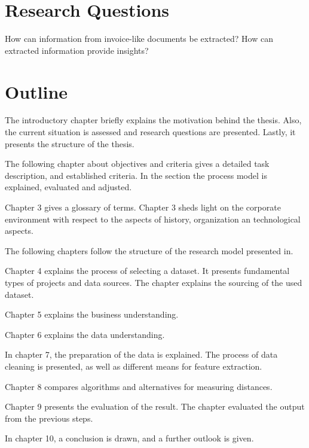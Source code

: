 \section{Research Questions}
\label{research-q}
How can information from invoice-like documents be extracted?
How can extracted information provide insights?

\section{Outline}
The introductory chapter briefly explains the motivation behind the thesis. Also, the current situation is assessed and research questions are presented. Lastly, it presents the structure of the thesis.

The following chapter about objectives and criteria gives a detailed task description, and established criteria. In the section the process model is explained, evaluated and adjusted.

Chapter 3 gives a glossary of terms. Chapter 3 sheds light on the corporate environment with respect to the aspects of history, organization an technological aspects. 

The following chapters follow the structure of the research model presented in.

Chapter 4 explains the process of selecting a dataset. It presents fundamental types of projects and data sources. The chapter explains the sourcing of the used dataset.

Chapter 5 explains the business understanding.

Chapter 6 explains the data understanding.

In chapter 7, the preparation of the data is explained. The process of data cleaning is presented, as well as different means for feature extraction.

Chapter 8 compares algorithms and alternatives for measuring distances.

Chapter 9 presents the evaluation of the result. The chapter evaluated the output from the previous steps.

In chapter 10, a conclusion is drawn, and a further outlook is given.